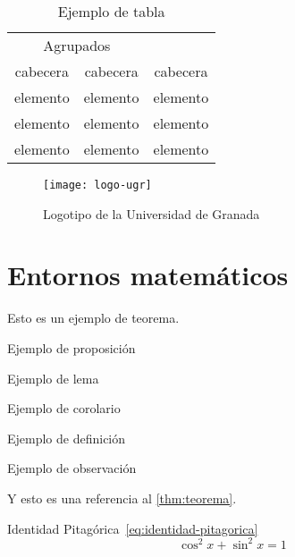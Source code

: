 \begin{table}[htpb]
  \centering
  \begin{tabular}{ccc} \toprule
    \multicolumn{2}{c}{Agrupados} \\ \cmidrule(r){1-2}
    cabecera & cabecera & cabecera          \\ \midrule
    elemento & elemento & elemento          \\ 
    elemento & elemento & elemento          \\ 
    elemento & elemento & elemento          \\ \bottomrule
  \end{tabular}
  \caption{Ejemplo de tabla}
  \label{tb:ejemplo-tabla}
\end{table}

\begin{figure}[htpb]
  \centering
  \texttt{[image: logo-ugr]}
  \caption{Logotipo de la Universidad de Granada}
  \label{fig:logo-ugr}
\end{figure}

\section{Entornos matemáticos}

\begin{teorema}\label{thm:teorema}
Esto es un ejemplo de teorema.
\end{teorema}

\begin{proposicion}
Ejemplo de proposición
\end{proposicion}

\begin{lema}
Ejemplo de lema
\end{lema}

\begin{corolario}
Ejemplo de corolario
\end{corolario}

\begin{definicion}
Ejemplo de definición
\end{definicion}

\begin{observacion}
Ejemplo de observación
\end{observacion}

Y esto es una referencia al \autoref{thm:teorema}. 

Identidad Pitagórica~\eqref{eq:identidad-pitagorica}
\begin{equation}\label{eq:identidad-pitagorica}
  \cos^2 x + \sin^2 x = 1
\end{equation}

